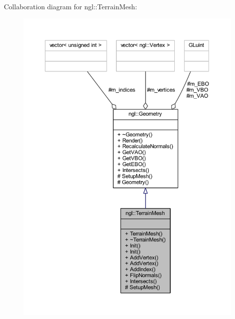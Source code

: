 Collaboration diagram for ngl\+:\+:Terrain\+Mesh\+:
\nopagebreak
\begin{figure}[H]
\begin{center}
\leavevmode
\includegraphics[width=350pt]{classngl_1_1_terrain_mesh__coll__graph}
\end{center}
\end{figure}
